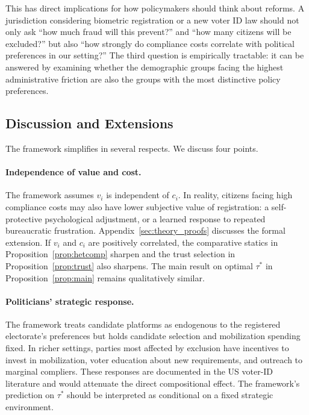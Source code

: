 This has direct implications for how policymakers should think about reforms. A jurisdiction considering biometric registration or a new voter ID law should not only ask ``how much fraud will this prevent?'' and ``how many citizens will be excluded?'' but also ``how strongly do compliance costs correlate with political preferences in our setting?'' The third question is empirically tractable: it can be answered by examining whether the demographic groups facing the highest administrative friction are also the groups with the most distinctive policy preferences.

\subsection{Discussion and Extensions}
\label{ssec:discussion}

The framework simplifies in several respects. We discuss four points.

\paragraph{Independence of value and cost.} The framework assumes $v_i$ is independent of $c_i$. In reality, citizens facing high compliance costs may also have lower subjective value of registration: a self-protective psychological adjustment, or a learned response to repeated bureaucratic frustration. Appendix~\ref{sec:theory_proofs} discusses the formal extension. If $v_i$ and $c_i$ are positively correlated, the comparative statics in Proposition~\ref{prop:hetcomp} sharpen and the trust selection in Proposition~\ref{prop:trust} also sharpens. The main result on optimal $\tau^*$ in Proposition~\ref{prop:main} remains qualitatively similar.

\paragraph{Politicians' strategic response.} The framework treats candidate platforms as endogenous to the registered electorate's preferences but holds candidate selection and mobilization spending fixed. In richer settings, parties most affected by exclusion have incentives to invest in mobilization, voter education about new requirements, and outreach to marginal compliers. These responses are documented in the US voter-ID literature \citep{Grimmer2021TheDurableDifferen} and would attenuate the direct compositional effect. The framework's prediction on $\tau^*$ should be interpreted as conditional on a fixed strategic environment.

